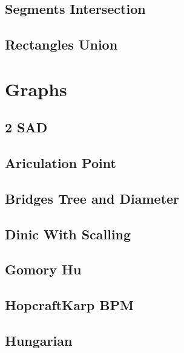 \subsection{Segments Intersection}
\raggedbottom
\hrulefill
\subsection{Rectangles Union}
\raggedbottom
\hrulefill

\section{Graphs}
\subsection{2 SAD}
\raggedbottom
\hrulefill
\subsection{Ariculation Point}
\raggedbottom
\hrulefill
\subsection{Bridges Tree and Diameter}
\raggedbottom
\hrulefill
\subsection{Dinic With Scalling}
\raggedbottom
\hrulefill
\subsection{Gomory Hu}
\raggedbottom
\hrulefill
\subsection{HopcraftKarp BPM}
\raggedbottom
\hrulefill
\subsection{Hungarian}
\raggedbottom
\hrulefill
